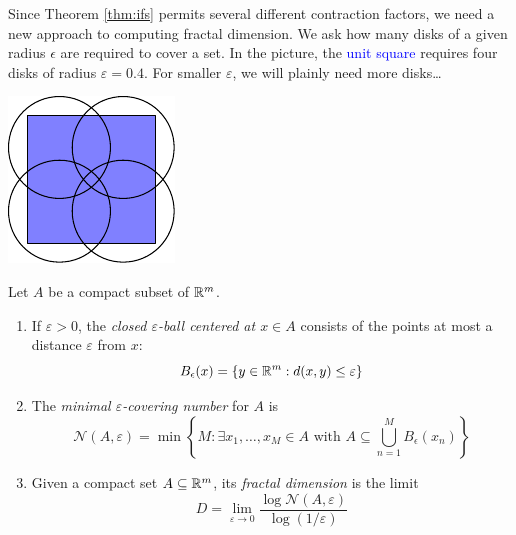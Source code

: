 \begin{minipage}[t]{0.8\linewidth}\vspace{0pt}

Since Theorem \ref{thm:ifs} permits several different contraction factors, we need a new approach to computing fractal dimension. We ask how many disks of a given radius $\epsilon$ are required to cover a set. In the picture, the \textcolor{blue}{unit square} requires four disks of radius $\varepsilon=0.4$. For smaller $\varepsilon$, we will plainly need more disks\ldots
\end{minipage}
\hfill
\begin{minipage}[t]{0.19\linewidth}\vspace{0pt}
\flushright\includegraphics{epsiloncover}
\end{minipage}


\begin{defn}{}{}
Let $A$ be a compact subset of $\mathbb{R}^m$.
\begin{enumerate}
  \item If $\varepsilon>0$, the \emph{closed $\varepsilon$-ball centered at $x\in A$} consists of the points at most a distance $\varepsilon$ from $x$:
	\[B_\epsilon(x)=\{y\in\mathbb{R}^m:d(x,y)\le\varepsilon\}\]
	\item The \emph{minimal $\varepsilon$-covering number} for $A$ is
	\[\mathcal N(A,\varepsilon)=\min\left\{M:\exists x_1,\ldots,x_M\in A\text{ with }A\subseteq \bigcup\limits_{n=1}^MB_\epsilon(x_n)\right\}\]
	
	\item Given a compact set $A\subseteq\mathbb{R}^m$, its \emph{fractal dimension} is the limit
\[D=\lim_{\varepsilon\to 0}\frac{\log\mathcal N(A,\varepsilon)}{\log (1/\varepsilon)}\]
\end{enumerate}
\end{defn}

